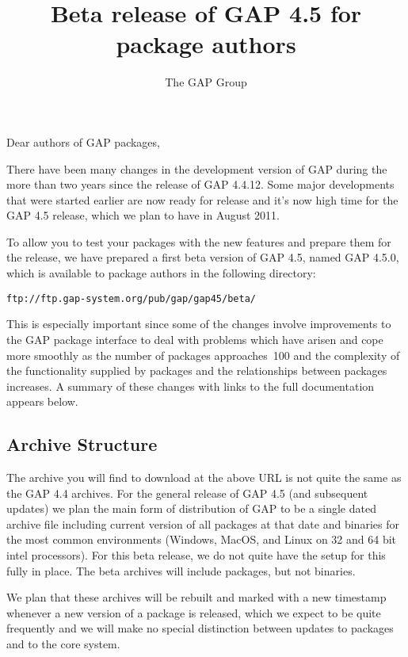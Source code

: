 \documentclass[10pt]{article}
\title{Beta release of GAP 4.5 for package authors}
\author{The GAP Group}
\def\releasemonth{August 2011}
\newcommand{\todo}[1]{}%
\begin{document}
\maketitle

Dear authors of GAP packages,

There have been many changes in the development version of GAP during the more
than two years since the release of GAP 4.4.12. Some
major developments that were started earlier are now ready for release and it's
now high time for the GAP 4.5 release, which we plan to have in \releasemonth.

To allow you to test your packages with the new features and prepare them for the release, we have prepared a first beta version of GAP 4.5, named GAP 4.5.0, which
is available to package authors in the following directory:

\begin{center}
\verb|ftp://ftp.gap-system.org/pub/gap/gap45/beta/|
\end{center}

This is especially important since some of the changes involve improvements to the GAP package interface to deal with problems which have arisen and 
cope more smoothly as the number of packages approaches~100 and the complexity of the functionality supplied by packages and the relationships between packages increases. 
A summary of these changes with links to the full documentation appears below.

\todo{Moving to a single archive, we wrap GAP 4.5 with packages
from the start. Need more thought about version numbers - may need
to reflect package binaries if statically compiled into the kernel.}

\subsection*{Archive Structure}

The archive you will find to download at the above URL is not quite the same as the GAP 4.4 archives. For the general release of GAP 4.5 (and subsequent updates) 
we plan the main form of distribution of GAP to be a single dated archive file including current version of all packages 
at that date and binaries for the most common 
environments (Windows, MacOS, and Linux on 32 and 64 bit intel processors). For this beta release, we do not quite have the setup for this fully in place. 
The beta archives will include packages, but not binaries. 

We plan that these archives will be rebuilt and marked with a new timestamp
whenever a new version of a package is released, which we expect to be quite frequently 
and we will make no special distinction between 
updates to packages and to the core system.
\end{document}
